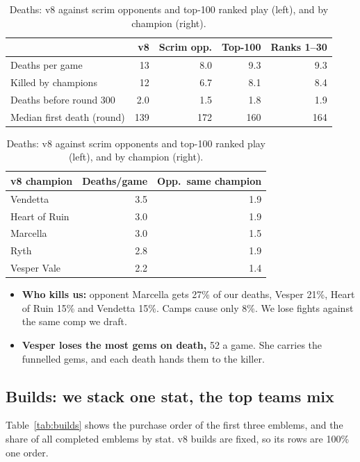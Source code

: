 \documentclass[11pt,a4paper]{article}
\begin{document}
\begin{table}[H]
\centering\footnotesize\setlength{\tabcolsep}{4pt}
\begin{tabular}{lrrrr}
\toprule
 & v8 & Scrim opp. & Top-100 & Ranks 1--30 \\
\midrule
Deaths per game            & 13  & 8.0 & 9.3 & 9.3 \\
Killed by champions        & 12  & 6.7 & 8.1 & 8.4 \\
Deaths before round 300    & 2.0 & 1.5 & 1.8 & 1.9 \\
Median first death (round) & 139 & 172 & 160 & 164 \\
\bottomrule
\end{tabular}
\quad
\begin{tabular}{lrr}
\toprule
v8 champion & Deaths/game & Opp.\ same champion \\
\midrule
Vendetta      & 3.5 & 1.9 \\
Heart of Ruin & 3.0 & 1.9 \\
Marcella      & 3.0 & 1.5 \\
Ryth          & 2.8 & 1.9 \\
Vesper Vale   & 2.2 & 1.4 \\
\bottomrule
\end{tabular}
\caption{Deaths: v8 against scrim opponents and top-100 ranked play (left), and by champion (right).}
\end{table}

\begin{itemize}
  \item \textbf{Who kills us:} opponent Marcella gets 27\% of our deaths, Vesper 21\%, Heart of Ruin 15\% and Vendetta 15\%. Camps cause only 8\%. We lose fights against the same comp we draft.
  \item \textbf{Vesper loses the most gems on death,} 52 a game. She carries the funnelled gems, and each death hands them to the killer.
\end{itemize}

\subsection{Builds: we stack one stat, the top teams mix}

Table~\ref{tab:builds} shows the purchase order of the first three emblems, and the share of all completed emblems by stat. v8 builds are fixed, so its rows are 100\% one order.
\end{document}
